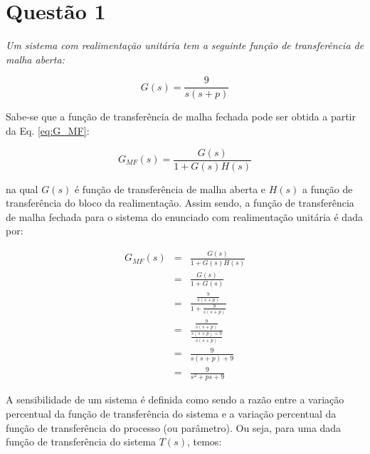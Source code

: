 \documentclass[a4paper,12pt]{article}
\let\D\displaystyle
\begin{document}


\section*{Questão 1}
{\it Um sistema com realimentação unitária tem a seguinte função de
transferência de malha aberta:}

\begin{equation}\nonumber
G(s) = \frac{9}{s(s+p)}
\end{equation}


\vspace{0.5cm}


\vspace{0.25cm}

\noindent Sabe-se que a função de transferência de malha fechada pode ser obtida
a partir da Eq. \ref{eq:G_MF}:

\begin{equation}\label{eq:G_MF}
G_{MF}(s) = \frac{G(s)}{1+G(s)H(s)}
\end{equation}

\noindent na qual $G(s)$ é função de transferência de malha aberta e $H(s)$ a
função de transferência do bloco da realimentação. Assim sendo, a função de
transferência de malha fechada para o sistema do enunciado com realimentação
unitária é dada por:

\begin{eqnarray}
G_{MF}(s) & = & \frac{G(s)}{1+G(s)H(s)}\nonumber\\
          & = & \frac{G(s)}{1+G(s)}\nonumber\\
          & = & \frac{\D\frac{9}{s(s+p)}}{1+\D\frac{9}{s(s+p)}}\nonumber\\
          & = & \frac{\D\frac{9}{s(s+p)}}{\D\frac{s(s+p)+9}{s(s+p)}}\nonumber\\
          & = & \frac{9}{s(s+p)+9}\nonumber\\
          & = & \frac{9}{s^2 + ps + 9}\label{eq:G_MF_q1}
\end{eqnarray}

A sensibilidade de um sistema é definida como sendo a razão entre a variação
percentual da função de transferência do sistema e a variação percentual da
função de transferência do processo (ou parâmetro). Ou seja, para uma dada
função de transferência do sistema $T(s)$, temos:
\end{document}

